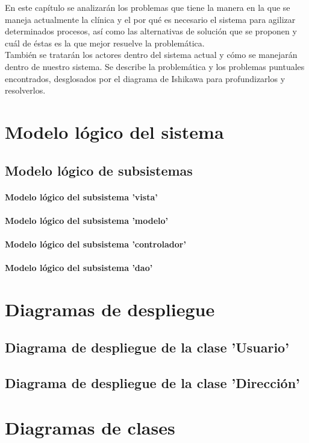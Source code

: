 En este capítulo se analizarán los problemas que tiene la manera en la que se maneja actualmente la clínica y el por qué es necesario el sistema para agilizar determinados procesos, así como las alternativas de solución que se proponen y cuál de éstas es la que mejor resuelve la problemática. \\

También se tratarán los actores dentro del sistema actual y cómo se manejarán dentro de nuestro sistema. Se describe la problemática y los problemas puntuales encontrados, desglosados por el diagrama de Ishikawa para profundizarlos y resolverlos.

\section{Modelo lógico del sistema}

\subsection{Modelo lógico de subsistemas}

\paragraph{Modelo lógico del subsistema 'vista'}
\paragraph{Modelo lógico del subsistema 'modelo'}
\paragraph{Modelo lógico del subsistema 'controlador'}
\paragraph{Modelo lógico del subsistema 'dao'}

\section{Diagramas de despliegue}

\subsection{Diagrama de despliegue de la clase 'Usuario'}

\subsection{Diagrama de despliegue de la clase 'Dirección'}

\section{Diagramas de clases}